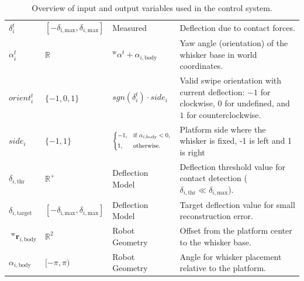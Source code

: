 \begin{table}[htb]
\begin{tabular}{p{1cm} p{2cm} p{3cm} p{8cm}}
        \midrule
        \(\delta_{i}^{t}\)                                   & \([-\delta_{\mathrm{i, \mathrm{max}}},\delta_{i, \mathrm{max}}]\) & Measured                                                & Deflection due to contact forces.                                                                                           \\
        \(\alpha_{i}^{t}\)                                   & \(\mathbb{R}\)                                                    & \(^{\mathrm{w}}\alpha^{t} + \alpha_{i, \mathrm{body}}\) & Yaw angle (orientation) of the whisker base in world coordinates.                                                           \\
        \(orient_{i}^{t}\)                                   & \(\{-1, 0, 1\}\)                                                  & \(sgn(\delta_{i}^{t}) \cdot side_{i}\)                  & Valid swipe orientation with current deflection: \(-1\) for clockwise, \(0\) for undefined, and \(1\) for counterclockwise. \\
        \(side_{i}\)                                         & \(\{-1, 1\}\)                                                     & \(\branch{\alpha_{i,\mathrm{body}} < 0}{-1}{1}\)        & Platform side where the whisker is fixed, -1 is left and 1 is right                                                         \\
        \(\delta_{i, \mathrm{thr}}\)                         & \(\mathbb{R}^{+}\)                                                & Deflection Model                                        & Deflection threshold value for contact detection (\(\delta_{i, \mathrm{thr}}\ll\delta_{i, \mathrm{max}}\)).                 \\
        \(\delta_{i, \mathrm{target}}\)                      & \([-\delta_{\mathrm{i, max}},\delta_{i, \mathrm{max}}]\)          & Deflection Model                                        & Target deflection value for small reconstruction error.                                                                     \\
        \(\;^{\mathrm{w}}\boldsymbol{r}_{i, \mathrm{body}}\) & \(\mathbb{R}^2\)                                                  & Robot Geometry                                          & Offset from the platform center to the whisker base.                                                                        \\
        \(\alpha_{i, \mathrm{body}}\)                        & \([-\pi,\pi)\)                                                    & Robot Geometry                                          & Angle for whisker placement relative to the platform.                                                                       \\
        \bottomrule
    \end{tabular}
    \caption{Overview of input and output variables used in the control system.}
    \label{tab:variables}
\end{table}

